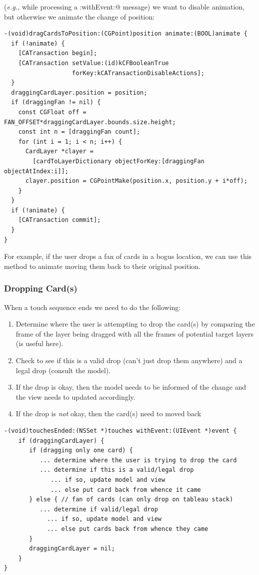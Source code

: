 \documentclass[11pt]{article}
\begin{document}
({\it e.g.,} while processing a \verb@touchesMoved:withEvent:@ message)
we want to disable animation, 
but otherwise we animate the change of position:
\begin{verbatim}
-(void)dragCardsToPosition:(CGPoint)position animate:(BOOL)animate {
  if (!animate) {
    [CATransaction begin];
    [CATransaction setValue:(id)kCFBooleanTrue
                   forKey:kCATransactionDisableActions];
  }
  draggingCardLayer.position = position;
  if (draggingFan != nil) {
    const CGFloat off = FAN_OFFSET*draggingCardLayer.bounds.size.height;
    const int n = [draggingFan count];
    for (int i = 1; i < n; i++) {
      CardLayer *clayer =
        [cardToLayerDictionary objectForKey:[draggingFan objectAtIndex:i]];
      clayer.position = CGPointMake(position.x, position.y + i*off);
    }
  }
  if (!animate) {
    [CATransaction commit];
  }
}
\end{verbatim}
For example, if the user drops a fan of cards in a bogus location, we can
use this method to animate moving them back to their original position.

\subsubsection{Dropping Card(s)}

When a touch sequence ends we need to do the following:
\begin{enumerate}
\item Determine where the user is attempting to drop
  the card(s) by comparing the frame of
  the layer being dragged with all the frames of potential target layers
  (\verb@CGRectIntersectsRect@ is useful here).
\item Check to see if this is a valid drop (can't just drop them anywhere) 
  and a legal drop (consult the model).
\item If the drop is okay, then the model needs to be informed of the change
  and the view needs to updated accordingly.
\item If the drop is {\em not} okay, then the card(s) need to moved back
\end{enumerate}
\begin{verbatim}
-(void)touchesEnded:(NSSet *)touches withEvent:(UIEvent *)event {
    if (draggingCardLayer) {
       if (dragging only one card) {
          ... determine where the user is trying to drop the card
          ... determine if this is a valid/legal drop
             ... if so, update model and view
             ... else put card back from whence it came
       } else { // fan of cards (can only drop on tableau stack)
          ... determine if valid/legal drop
            ... if so, update model and view
            ... else put cards back from whence they came
       }
       draggingCardLayer = nil;
    }
}
\end{verbatim}
\end{document}
